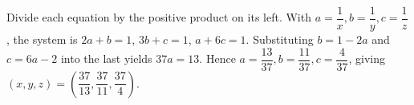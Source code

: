 Divide each equation by the positive product on its left. With $a=\dfrac{1}{x},b=\dfrac{1}{y},c=\dfrac{1}{z}$, the system is $2a+b=1$, $3b+c=1$, $a+6c=1$. Substituting $b=1-2a$ and $c=6a-2$ into the last yields $37a=13$. Hence $a=\dfrac{13}{37},b=\dfrac{11}{37},c=\dfrac{4}{37}$, giving $\boxed{(x,y,z)=(\dfrac{37}{13},\dfrac{37}{11},\dfrac{37}{4})}$.
